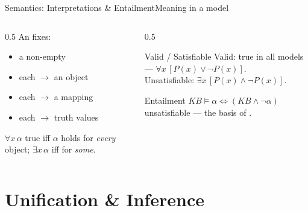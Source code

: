 \documentclass[aspectratio=169,11pt]{beamer}
\begin{document}
\begin{frame}{Semantics: Interpretations \& Entailment}{Meaning in a model}
  \begin{columns}[T]
    \begin{column}{0.5\textwidth}
      An  fixes:
      \begin{itemize}\small
        \item a non-empty 
        \item each  $\to$ an object
        \item each  $\to$ a mapping
        \item each  $\to$ truth values
      \end{itemize}
      \scriptsize $\forall x\,\alpha$ true iff $\alpha$ holds for \emph{every} object;
      $\exists x\,\alpha$ iff for \emph{some}.
    \end{column}
    \begin{column}{0.5\textwidth}
      \begin{block}{Valid / Satisfiable}
        \small
        Valid: true in all models — $\forall x\,[P(x)\lor\neg P(x)]$. \\
        Unsatisfiable: $\exists x\,[P(x)\land\neg P(x)]$.
      \end{block}
      \begin{alertblock}{Entailment}
        \small $KB \models \alpha \iff (KB \land \neg\alpha)$ unsatisfiable
        — the basis of .
      \end{alertblock}
    \end{column}
  \end{columns}
\end{frame}

\section{Unification \& Inference}
\end{document}
